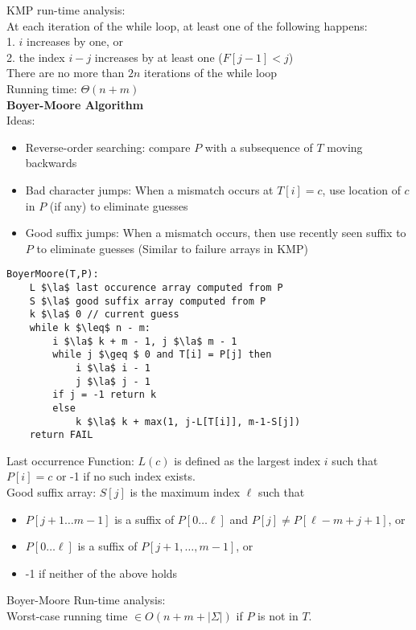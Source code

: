 \documentclass[12pt]{article}
\newcommand{\la}{\leftarrow}
\begin{document}
{KMP run-time analysis:\\
At each iteration of the while loop, at least one of the following happens:\\
1. $i$ increases by one, or\\
2. the index $i-j$ increases by at least one ($F[j-1] < j$)\\
There are no more than $2n$ iterations of the while loop\\
Running time: $\Theta(n+m)$\\

\textbf{Boyer-Moore Algorithm}\\

Ideas:
\begin{itemize}
	\renewcommand\labelitemi{--}
	\item Reverse-order searching: compare $P$ with a subsequence of $T$ moving backwards
	\item Bad character jumps: When a mismatch occurs at $T[i] = c$, use location of $c$ in $P$ (if any) to eliminate guesses
	\item Good suffix jumps: When a mismatch occurs, then use recently seen suffix to $P$ to eliminate guesses (Similar to failure arrays in KMP)
\end{itemize} 
\begin{lstlisting}[mathescape=true]
BoyerMoore(T,P):
	L $\la$ last occurence array computed from P
	S $\la$ good suffix array computed from P
	k $\la$ 0 // current guess
	while k $\leq$ n - m:
		i $\la$ k + m - 1, j $\la$ m - 1
		while j $\geq $ 0 and T[i] = P[j] then
			i $\la$ i - 1
			j $\la$ j - 1
		if j = -1 return k
		else
			k $\la$ k + max(1, j-L[T[i]], m-1-S[j])
	return FAIL
\end{lstlisting}
Last occurrence Function: $L(c)$ is defined as the largest index $i$ such that $P[i]  = c$ or -1 if no such index exists.\\
Good suffix array: $S[j]$ is the maximum index $\ell$ such that 
\begin{itemize}
	\renewcommand\labelitemi{--}
	\item $P[j+1\dots m-1]$ is a suffix of $P[0\dots\ell]$ and $P[j]\ne P[\ell-m+j+1]$, or
	\item $P[0\dots\ell]$ is a suffix of $P[j+1,\dots,m-1]$, or
	\item -1 if neither of the above holds
\end{itemize}
Boyer-Moore Run-time analysis:\\
Worst-case running time $\in O(n+m+|\Sigma|)$ if $P$ is not in $T$.\\

}
\end{document}
